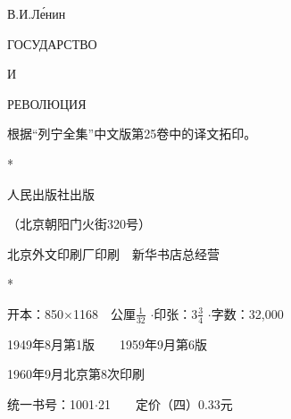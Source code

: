 \begin{center}
		
	\fangsong\mbox{}
	
	\mbox{}\label{publish}
	
	В.И.Ле́нин
	
	ГОСУДАРСТВО
	
	И 
	 
	РЕВОЛЮЦИЯ
	
	{\small 根据“列宁全集”中文版第25卷中的译文拓印。}
	
	\vfill \normalsize {} 
	
	
	\normalfont{} 
	*
	
	人民出版社出版
	
	 （北京朝阳门火街320号）
	
	\normalsize 
	北京外文印刷厂印刷~~新华书店总经营
	
	
	*
	
	开本：850$\times$1168~~公厘$\frac{1}{32}$ $\cdot$印张：$3\frac{3}{4}$ $\cdot$字数：32,000
	
	1949年8月第1版~~~~1959年9月第6版
	
	1960年9月北京第8次印刷
	
	\normalsize 统一书号：1001$\cdot$21~~~~定价（四）0.33元
\end{center}
\thispagestyle{empty}
\clearpage
